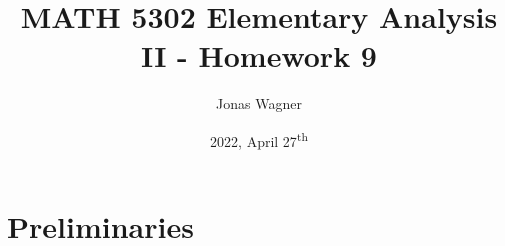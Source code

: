 \documentclass[]{article}
\title{MATH 5302 Elementary Analysis II - Homework 9}
\author{Jonas Wagner}
\date{2022, April 27\textsuperscript{th}}
\newcommand{\R}{\mathbb{R}}
\newtheorem{definition}{Definition}
\begin{document}
\maketitle

\tableofcontents

\newpage
\section*{Preliminaries}

\end{document}
